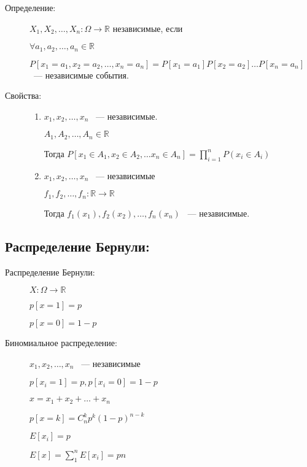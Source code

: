 \documentclass[12pt]{article}
\begin{document}
\begin{description}
\item[Определение:] $X_1, X_2, \ldots, X_n: \Omega \to \mathbb R$ независимые, если 

$\forall a_1, a_2, \ldots, a_n \in \mathbb R$

$P[x_1 = a_1, x_2 = a_2, \ldots, x_n = a_n] = P[x_1 = a_1]P[x_2 = a_2] \ldots P[x_n = a_n]$ ~--- независимые события.

\item[Свойства:] 

\begin{enumerate}
\item $x_1, x_2, \ldots, x_n$ ~--- независимые.

$A_1, A_2, \ldots, A_n \in \mathbb R$

Тогда $P[x_1 \in A_1, x_2 \in A_2, \ldots x_n \in A_n] = \prod_{i = 1}^{n} P(x_i \in A_i)$

\item $x_1, x_2, \ldots, x_n$ ~--- независимые

$f_1, f_2, \ldots, f_n: \mathbb R \to \mathbb R$

Тогда $f_1(x_1), f_2(x_2), \ldots, f_n(x_n)$ ~--- независимые.
\end{enumerate}


\end{description}


\subsection{Распределение Бернули:}

\begin{description}
\item[Распределение Бернули:] 

$X: \Omega \to \mathbb R$

$p[x = 1] = p$


$p[x = 0] = 1 - p$

\item[Биномиальное распределение:]

$x_1, x_2, \ldots, x_n$ ~--- независимые

$p[x_i = 1] = p, p[x_i = 0] = 1 - p$

$x = x_1 + x_2 + \ldots + x_n$

$p[x = k] = C_n^k p^k (1 - p)^{n - k}$

$E[x_i] = p$

$E[x] = \sum_{1}^n E[x_i] = pn$
\end{description}
\end{document}
